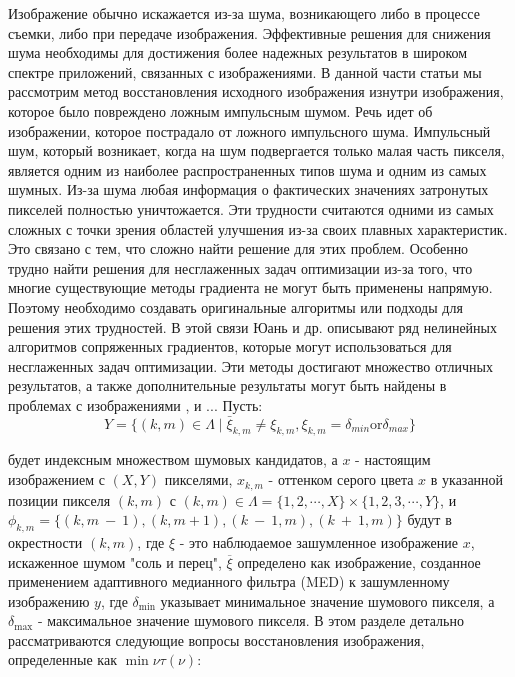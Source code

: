 Изображение обычно искажается из-за шума, возникающего либо в процессе съемки,
либо при передаче изображения. Эффективные решения для снижения шума необходимы
для достижения более надежных результатов в широком спектре приложений,
связанных с изображениями. В данной части статьи мы рассмотрим метод
восстановления исходного изображения изнутри изображения, которое было
повреждено ложным импульсным шумом. Речь идет об изображении, которое пострадало
от ложного импульсного шума. Импульсный шум, который возникает, когда на шум
подвергается только малая часть пикселя, является одним из наиболее
распространенных типов шума и одним из самых шумных. Из-за шума любая информация
о фактических значениях затронутых пикселей полностью уничтожается. Эти
трудности считаются одними из самых сложных с точки зрения областей улучшения
из-за своих плавных характеристик. Это связано с тем, что сложно найти решение
для этих проблем. Особенно трудно найти решения для несглаженных задач
оптимизации из-за того, что многие существующие методы градиента не могут быть
применены напрямую. Поэтому необходимо создавать оригинальные алгоритмы или
подходы для решения этих трудностей. В этой связи Юань и др.
\cite{art18,art19,art20,art21} описывают ряд нелинейных алгоритмов сопряженных
градиентов, которые могут использоваться для несглаженных задач оптимизации. Эти
методы достигают множество отличных результатов, а также дополнительные
результаты могут быть найдены в проблемах с изображениями
\cite{art22,art23,art24,art25,art26}, и ... Пусть:
\begin{equation*}
    Y=\{(k,m)\in\Lambda\mid\bar{\xi}_{k,m}\neq\xi_{k,m},\xi_{k,m}=\delta_{m i n} \text{or} \delta_{m a x}\}
\end{equation*}

будет индексным множеством шумовых кандидатов, а $x$ - настоящим изображением с
$\left( X, Y \right)$ пикселями, $x_{k,m}$ - оттенком серого цвета $x$ в
указанной позиции пикселя $\left( k, m \right)$ с
$(k,m)\in\Lambda=\{1,2,\cdots,X\}\times\{1,2,3,\cdots,Y\}$, и $\phi_{k,m}
= \{(k,m\:-\:1),(k,m+1),(k\:-\:1,m),(k\:+\:1,m)\}$ будут в окрестности $\left(k,
m \right)$, где $\xi$ - это наблюдаемое зашумленное изображение $x$, искаженное
шумом "соль и перец", $\overline{{\xi}}$ определено как изображение, созданное
применением адаптивного медианного фильтра (MED) к зашумленному изображению $y$,
где $\delta_{\min}$ указывает минимальное значение шумового пикселя, а $\delta_{\max}$ -
максимальное значение шумового пикселя. В этом разделе детально рассматриваются
следующие вопросы восстановления изображения, определенные как 
$\min\limits{\nu}\tau \left( \nu \right)$:

